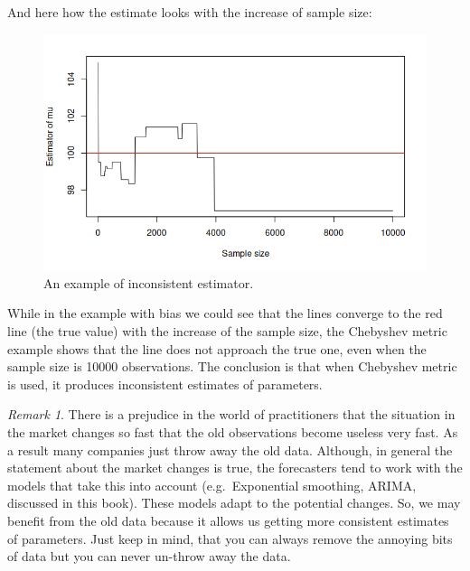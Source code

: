 \documentclass[
]{book}
\newenvironment{Shaded}{\begin{snugshade}}{\end{snugshade}}
\newcommand{\AttributeTok}[1]{\textcolor[rgb]{0.13,0.29,0.53}{#1}}
\newcommand{\DecValTok}[1]{\textcolor[rgb]{0.00,0.00,0.81}{#1}}
\newcommand{\FunctionTok}[1]{\textcolor[rgb]{0.13,0.29,0.53}{\textbf{#1}}}
\newcommand{\NormalTok}[1]{#1}
\newcommand{\SpecialCharTok}[1]{\textcolor[rgb]{0.81,0.36,0.00}{\textbf{#1}}}
\newcommand{\StringTok}[1]{\textcolor[rgb]{0.31,0.60,0.02}{#1}}
\theoremstyle{definition}
\theoremstyle{definition}
\theoremstyle{definition}
\theoremstyle{definition}
\theoremstyle{remark}
\newtheorem*{remark}{Remark}
\begin{document}
And here how the estimate looks with the increase of sample size:

\begin{Shaded}
\end{Shaded}

\begin{figure}
\includegraphics[width=9.72in]{images/02-statistics-consistency} \caption{An example of inconsistent estimator.}\label{fig:statsConsistency}
\end{figure}

While in the example with bias we could see that the lines converge to the red line (the true value) with the increase of the sample size, the Chebyshev metric example shows that the line does not approach the true one, even when the sample size is 10000 observations. The conclusion is that when Chebyshev metric is used, it produces inconsistent estimates of parameters.

\begin{remark}
There is a prejudice in the world of practitioners that the situation in the market changes so fast that the old observations become useless very fast. As a result many companies just throw away the old data. Although, in general the statement about the market changes is true, the forecasters tend to work with the models that take this into account (e.g.~Exponential smoothing, ARIMA, discussed in this book). These models adapt to the potential changes. So, we may benefit from the old data because it allows us getting more consistent estimates of parameters. Just keep in mind, that you can always remove the annoying bits of data but you can never un-throw away the data.
\end{remark}
\end{document}
